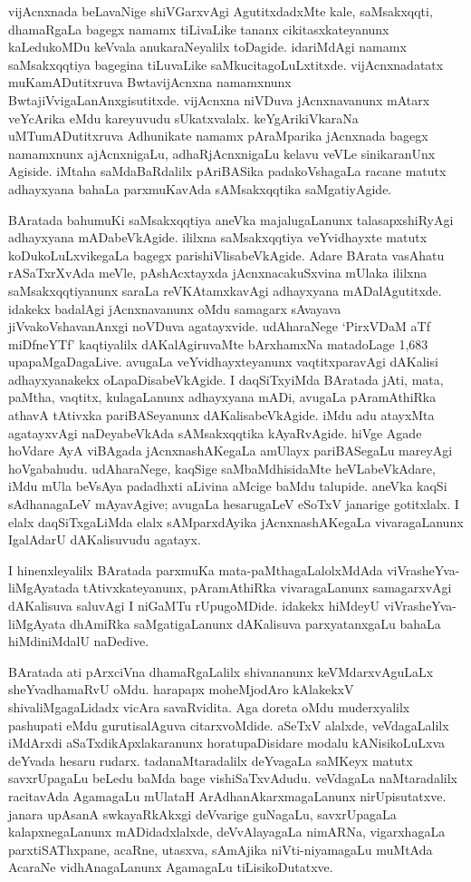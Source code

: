 vijAcnxnada beLavaNige shiVGarxvAgi AgutitxdadxMte kale, saMsakxqqti, dhamaRgaLa bagegx namamx tiLivaLike tananx cikitasxkateyanunx kaLedukoMDu keVvala anukaraNeyalilx toDagide. idariMdAgi namamx saMsakxqqtiya bagegina tiLuvaLike saMkucitagoLuLxtitxde. vijAcnxnadatatx muKamADutitxruva BwtavijAcnxna namamxnunx BwtajiVvigaLanAnxgisutitxde. vijAcnxna niVDuva jAcnxnavanunx mAtarx veYcArika eMdu kareyuvudu sUkatxvalalx. keYgArikiVkaraNa uMTumADutitxruva Adhunikate namamx pAraMparika jAcnxnada bagegx namamxnunx ajAcnxnigaLu, adhaRjAcnxnigaLu kelavu veVLe sinikaranUnx Agiside. iMtaha saMdaBaRdalilx pAriBASika padakoVshagaLa racane matutx adhayxyana bahaLa parxmuKavAda sAMsakxqqtika saMgatiyAgide.

BAratada bahumuKi saMsakxqqtiya aneVka majalugaLanunx talasapxshiRyAgi adhayxyana mADabeVkAgide. ililxna saMsakxqqtiya veYvidhayxte matutx koDukoLuLxvikegaLa bagegx parishiVlisabeVkAgide. Adare BArata vasAhatu rASaTxrXvAda meVle, pAshAcxtayxda jAcnxnacakuSx\-vina mUlaka ililxna saMsakxqqtiyanunx saraLa reVKAtamxkavAgi adhayxyana mADalAgutitxde. idakekx badalAgi jAcnxnavanunx oMdu samagarx sAvayava jiVvakoVshavanAnxgi noVDuva agatayxvide. udAharaNege `PirxVDaM aTf miDfneYTf' kaqtiyalilx dAKalAgiruvaMte bArxhamxNa matadoLage 1,683 upapaMgaDagaLive. avugaLa veYvidhayxteyanunx vaqtitxparavAgi dAKalisi adhayxyanakekx oLapaDisabeVkAgide. I daqSiTxyiMda BAratada jAti, mata, paMtha, vaqtitx, kulagaLanunx adhayxyana mADi, avugaLa pAramAthiRka athavA tAtivxka pariBASeyanunx dAKalisabeVkAgide. iMdu adu atayxMta agatayxvAgi naDeyabeVkAda sAMsakxqqtika kAyaRvAgide. hiVge Agade hoVdare AyA viBAgada jAcnxnashAKegaLa amUlayx pariBASegaLu mareyAgi hoVgabahudu. udAharaNege, kaqSige saMbaMdhisidaMte heVLabeVkAdare, iMdu mUla beVsAya padadhxti aLivina aMcige baMdu talupide. aneVka kaqSi sAdhanagaLeV mAyavAgive; avugaLa hesarugaLeV eSoTxV janarige gotitxlalx. I elalx daqSiTxgaLiMda elalx sAMparxdAyika jAcnxnashAKegaLa vivaragaLanunx IgalAdarU dAKalisuvudu agatayx. 

I hinenxleyalilx BAratada parxmuKa mata-paMthagaLalolxMdAda viVrasheYva-liMgAyatada tAtivxkateyanunx, pAramAthiRka vivara\-gaLanunx samagarxvAgi dAKalisuva saluvAgi I niGaMTu rUpugoMDide. idakekx hiMdeyU viVrasheYva-liMgAyata dhAmiRka saMgatigaLanunx dAKalisuva parxyatanxgaLu bahaLa hiMdiniMdalU naDedive.

BAratada ati pArxciVna dhamaRgaLalilx shivananunx keVMdarxvAguLaLx sheYvadhamaRvU oMdu. harapapx moheMjodAro kAlakekxV shiva\-liMgagaLidadx vicAra savaRvidita. Aga doreta oMdu muderxyalilx pashupati eMdu gurutisalAguva citarxvoMdide. aSeTxV alalxde, veVdagaLalilx iMdArxdi aSaTxdikApxlakaranunx horatupaDisidare modalu kANisikoLuLxva deYvada hesaru rudarx. tadanaMtaradalilx deYvagaLa saMKeyx matutx savxrUpagaLu beLedu baMda bage vishiSaTxvAdudu. veVdagaLa naMtaradalilx racitavAda AgamagaLu mUlataH ArAdhanAkarxmagaLanunx nirUpisutatxve. janara upAsanA swkayaRkAkxgi deVvarige guNagaLu, savxrUpagaLa kalapxnegaLanunx mADidadxlalxde, deVvAlayagaLa nimARNa,  vigarxhagaLa parxtiSAThxpane, acaRne, utasxva, sAmAjika niVti-niyamagaLu muMtAda AcaraNe vidhAnagaLanunx AgamagaLu tiLisikoDutatxve.

